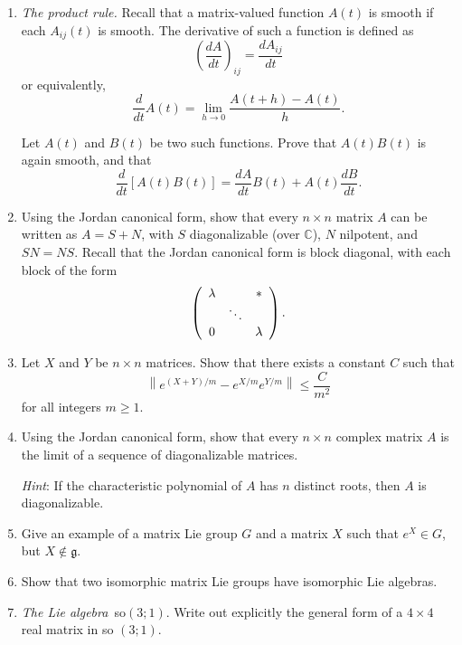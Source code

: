 \documentclass{amsbook}
\let \frak = \mathfrak
\theoremstyle{plain}
\numberwithin{equation}{chapter}
\numberwithin{theorem}{chapter}
\begin{document}
\begin{enumerate}
\item \label{product.rule}\textit{The product rule}\emph{.} Recall that a
matrix-valued function $A(t)$ is smooth if each $A_{ij}(t)$ is smooth. The
derivative of such a function is defined as
\[
\left(  \frac{dA}{dt}\right)  _{ij}=\frac{dA_{ij}}{dt}%
\]
or equivalently,
\[
\frac{d}{dt}A(t)=\lim_{h\rightarrow0}\frac{A(t+h)-A(t)}{h}\text{.}%
\]

Let $A(t)$ and $B(t)$ be two such functions. Prove that $A(t)B(t)$ is again
smooth, and that
\[
\frac{d}{dt}\left[  A(t)B(t)\right]  =\frac{dA}{dt}B(t)+A(t)\frac{dB}%
{dt}\text{.}%
\]

\item \label{decomposition}Using the Jordan canonical form, show that every
$n\times n$ matrix $A$ can be written as $A=S+N$, with $S$ diagonalizable
(over $\mathbb{C}$), $N$ nilpotent, and $SN=NS$. Recall that the Jordan
canonical form is block diagonal, with each block of the form
\[
\left(
\begin{array}
[c]{ccc}%
\lambda &  & \ast\\
& \ddots & \\
0 &  & \lambda
\end{array}
\right)  \text{.}%
\]

\item \label{lie.product}Let $X$ and $Y$ be $n\times n$ matrices. Show that
there exists a constant $C$ such that
\[
\left\|  e^{(X+Y)/m}-e^{X/m}e^{Y/m}\right\|  \leq\frac{C}{m^{2}}%
\]
for all integers $m\geq1$.

\item \label{diagonal.limit}Using the Jordan canonical form, show that every
$n\times n$ complex matrix $A$ is the limit of a sequence of diagonalizable matrices.

\textit{Hint}: If the characteristic polynomial of $A$ has $n$ distinct roots,
then $A$ is diagonalizable.

\item  Give an example of a matrix Lie group $G$ and a matrix $X$ such that
$e^{X}\in G$, but $X\notin\frak{g}$.

\item \label{isomorphism}Show that two isomorphic matrix Lie groups have
isomorphic Lie algebras.

\item \label{so31}\textit{The Lie algebra}\emph{\ }\textsf{so}$(3;1)$. Write
out explicitly the general form of a $4\times4$ real matrix in \textsf{so}%
$(3;1)$.


\end{enumerate}
\end{document}
